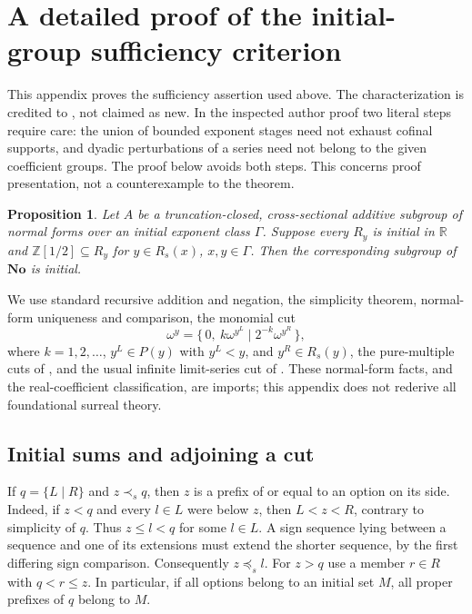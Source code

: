 \documentclass[11pt]{article}
\newcommand{\No}{\mathbf{No}}
\newcommand{\D}{\mathbb{Z}[1/2]}
\newcommand{\R}{\mathbb{R}}
\newtheorem{proposition}[theorem]{Proposition}
\begin{document}
\appendix
\section{A detailed proof of the initial-group sufficiency criterion}
\label{appendix}
This appendix proves the sufficiency assertion used above. The
characterization is credited to \cite[Theorem 5.1]{ek}, not claimed as new.
In the inspected author proof two literal steps require care:
the union of bounded exponent stages need not exhaust cofinal supports,
and dyadic perturbations of a series need not belong to the given
coefficient groups. The proof below avoids both steps. This concerns
proof presentation, not a counterexample to the theorem.

\begin{proposition}\label{suff}
Let $A$ be a truncation-closed, cross-sectional additive subgroup
of normal forms over an initial exponent class $\Gamma$.
Suppose every $R_y$ is initial in $\R$ and
$\D\subseteq R_y$ for $y\in R_s(x)$, $x,y\in\Gamma$.
Then the corresponding subgroup of $\No$ is initial.
\end{proposition}
We use standard recursive addition and negation, the simplicity theorem,
normal-form uniqueness and comparison, the monomial cut
\begin{equation}\label{leadercut}
 \omega^y=\{\,0,\ k\omega^{y^L}\mid 2^{-k}\omega^{y^R}\,\},
\end{equation}
where $k=1,2,\ldots$, $y^L\in P(y)$ with $y^L<y$, and $y^R\in R_s(y)$,
the pure-multiple cuts of \cite[Lemma 3.1(ii)--(iii)]{ek}, and the usual
infinite limit-series cut of \cite[Proposition 3.2(iii)]{ek}.
These normal-form facts, and the real-coefficient classification, are
imports; this appendix does not rederive all foundational surreal theory.

\subsection{Initial sums and adjoining a cut}
If $q=\{L\mid R\}$ and $z\prec_s q$, then $z$ is a prefix of or equal to
an option on its side. Indeed, if $z<q$ and every $l\in L$ were below
$z$, then $L<z<R$, contrary to simplicity of $q$. Thus
$z\le l<q$ for some $l\in L$. A sign sequence lying between a sequence
and one of its extensions must extend the shorter sequence, by the
first differing sign comparison. Consequently $z\preceq_s l$.
For $z>q$ use a member $r\in R$ with $q<r\le z$.
In particular, if all options belong to an initial set $M$, all proper
prefixes of $q$ belong to $M$.
\end{document}
